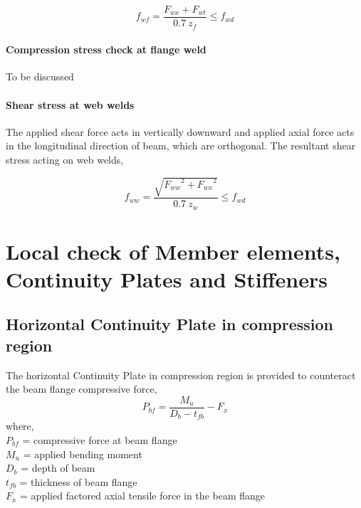 \documentclass[11.5pt,a4paper,oneside]{report}
\begin{document}
\begin{Form}
\begin{equation}
	f_{wf} = \frac{F_{wx} + F_{wt}}{0.7~z_f} \leq f_{wd}
\end{equation}

\subsubsection{Compression stress check at flange weld}
To be discussed

\subsubsection{Shear stress at web welds}
The applied shear force acts in vertically downward and 
applied axial force acts in the longitudinal direction of beam,
which are orthogonal. 
The resultant shear stress acting on web welds,

\begin{equation}
	f_{ww} = \frac{\sqrt{{F_{ww}}^2 + {F_{wx}}^2}}{0.7~z_w} \leq f_{wd}
\end{equation}

\chapter{Local check of Member elements, Continuity Plates and Stiffeners}

\section{Horizontal Continuity Plate in compression region}
The horizontal Continuity Plate in compression region is provided to counteract the beam flange compressive force, 
\begin{equation}
	P_{bf} = \frac{M_u}{D_b - t_{fb}} - F_x
\end{equation}
where,\\
\indent $P_{bf}$ = compressive force at beam flange \\ 
\indent ${M_u}$ = applied bending moment \\ 
\indent $D_b$ = depth of beam \\
\indent $t_{fb}$ = thickness of beam flange \\
\indent $F_x$ = applied factored axial tensile force in the beam flange\\


\end{Form}
\end{document}
